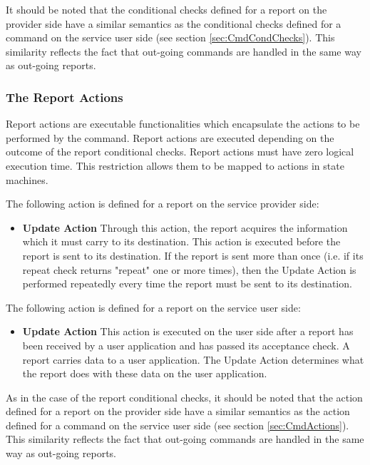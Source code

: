 It should be noted that the conditional checks defined for a report on the provider side have a similar semantics as the conditional checks defined for a command on the service user side (see section \ref{sec:CmdCondChecks}). This similarity reflects the fact that out-going commands are handled in the same way as out-going reports.

\subsubsection{The Report Actions}\label{sec:RepActions}

Report actions are executable functionalities which encapsulate the actions to be performed by the command. Report actions are executed depending on the outcome of the report conditional checks. Report actions must have zero logical execution time. This restriction allows them to be mapped to actions in state machines. 

The following action is defined for a report on the service provider side:

\begin{itemize}
\item \textbf{Update Action}
Through this action, the report acquires the information which it must carry to its destination. This action is executed before the report is sent to its destination. If the report is sent more than once (i.e. if its repeat check returns "repeat" one or more times), then the Update Action is performed repeatedly every time the report must be sent to its destination.
\end{itemize} 

The following action is defined for a report on the service user side:

\begin{itemize}
\item \textbf{Update Action}
This action is executed on the user side after a report has been received by a user application and has passed its acceptance check. A report carries data to a user application. The Update Action determines what the report does with these data on the user application. 
\end{itemize} 

As in the case of the report conditional checks, it should be noted that the action defined for a report on the provider side have a similar semantics as the action defined for a command on the service user side (see section \ref{sec:CmdActions}). This similarity reflects the fact that out-going commands are handled in the same way as out-going reports.

